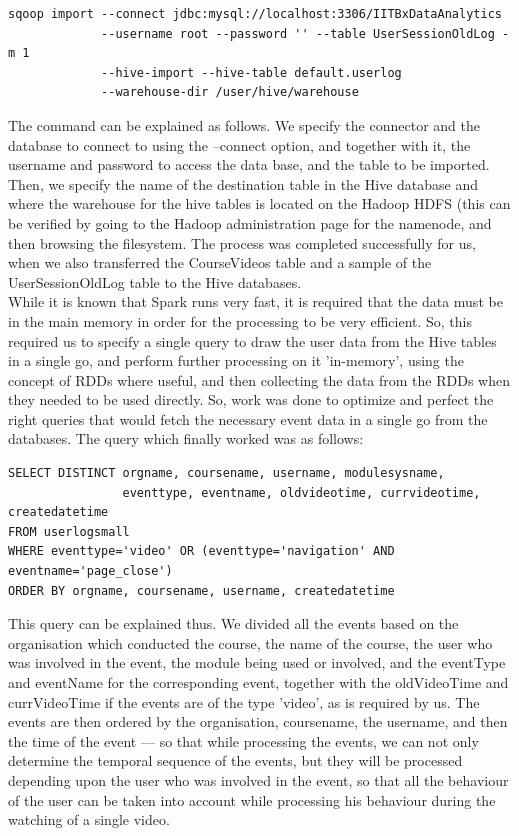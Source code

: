 \documentclass[16pt]{report}
\begin{document}
\begin{verbatim}
sqoop import --connect jdbc:mysql://localhost:3306/IITBxDataAnalytics 
             --username root --password '' --table UserSessionOldLog -m 1 
             --hive-import --hive-table default.userlog 
             --warehouse-dir /user/hive/warehouse 
\end{verbatim}

The command can be explained as follows. We specify the connector and the database to connect to using the --connect option, and together with it, the username and password to access the data base, and the table to be imported. Then, we specify the name of the destination table in the Hive database and where the warehouse for the hive tables is located on the Hadoop HDFS (this can be verified by going to the Hadoop administration page for the namenode, and then browsing the filesystem. The process was completed successfully for us, when we also transferred the CourseVideos table and a sample of the UserSessionOldLog table to the Hive databases.\\

While it is known that Spark runs very fast, it is required that the data must be in the main memory in order for the processing to be very efficient. So, this required us to specify a single query to draw the user data from the Hive tables in a single go, and perform further processing on it 'in-memory', using the concept of RDDs where useful, and then collecting the data from the RDDs  when they needed to be used directly. So, work was done to optimize and perfect the right queries that would fetch the necessary event data in a single go from the databases. The query which finally worked was as follows:

\begin{verbatim}
SELECT DISTINCT orgname, coursename, username, modulesysname, 
                eventtype, eventname, oldvideotime, currvideotime, createdatetime 
FROM userlogsmall 
WHERE eventtype='video' OR (eventtype='navigation' AND eventname='page_close') 
ORDER BY orgname, coursename, username, createdatetime
\end{verbatim}

This query can be explained thus. We divided all the events based on the organisation which conducted the course, the name of the course, the user who was involved in the event, the module being used or involved, and the eventType and eventName for the corresponding event, together with the oldVideoTime and currVideoTime if the events are of the type 'video', as is required by us. The events are then ordered by the organisation, coursename, the username, and then the time of the event --- so that while processing the events, we can not only determine the temporal sequence of the events, but they will be processed depending upon the user who was involved in the event, so that all the behaviour of the user can be taken into account while processing his behaviour during the watching of a single video. \\
\end{document}
